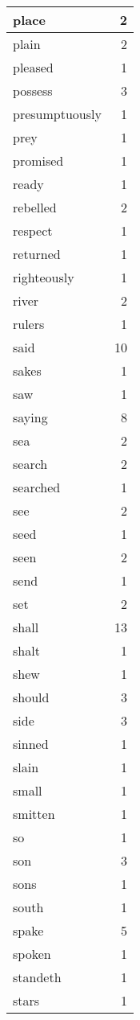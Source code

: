 \begin{center}
\begin{longtable}{l|r}
place & 2 \\ \hline
plain & 2 \\ \hline
pleased & 1 \\ \hline
possess & 3 \\ \hline
presumptuously & 1 \\ \hline
prey & 1 \\ \hline
promised & 1 \\ \hline
ready & 1 \\ \hline
rebelled & 2 \\ \hline
respect & 1 \\ \hline
returned & 1 \\ \hline
righteously & 1 \\ \hline
river & 2 \\ \hline
rulers & 1 \\ \hline
said & 10 \\ \hline
sakes & 1 \\ \hline
saw & 1 \\ \hline
saying & 8 \\ \hline
sea & 2 \\ \hline
search & 2 \\ \hline
searched & 1 \\ \hline
see & 2 \\ \hline
seed & 1 \\ \hline
seen & 2 \\ \hline
send & 1 \\ \hline
set & 2 \\ \hline
shall & 13 \\ \hline
shalt & 1 \\ \hline
shew & 1 \\ \hline
should & 3 \\ \hline
side & 3 \\ \hline
sinned & 1 \\ \hline
slain & 1 \\ \hline
small & 1 \\ \hline
smitten & 1 \\ \hline
so & 1 \\ \hline
son & 3 \\ \hline
sons & 1 \\ \hline
south & 1 \\ \hline
spake & 5 \\ \hline
spoken & 1 \\ \hline
standeth & 1 \\ \hline
stars & 1 \\ \hline

\end{longtable}
\end{center}
